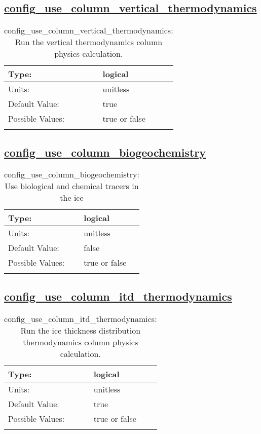 \subsection[config\_use\_column\_vertical\_thermodynamics]{\hyperref[sec:nm_tab_column_package]{config\_use\_column\_vertical\_thermodynamics}}
\label{subsec:nm_sec_config_use_column_vertical_thermodynamics}
\begin{center}
\begin{longtable}{| p{2.0in} || p{4.0in} |}
    \hline
    Type: & logical \\
    \hline
    Units: & \si{unitless} \\
    \hline
    Default Value: & true \\
    \hline
    Possible Values: & true or false \\
    \hline
    \caption{config\_use\_column\_vertical\_thermodynamics: Run the vertical thermodynamics column physics calculation.}
\end{longtable}
\end{center}
\subsection[config\_use\_column\_biogeochemistry]{\hyperref[sec:nm_tab_column_package]{config\_use\_column\_biogeochemistry}}
\label{subsec:nm_sec_config_use_column_biogeochemistry}
\begin{center}
\begin{longtable}{| p{2.0in} || p{4.0in} |}
    \hline
    Type: & logical \\
    \hline
    Units: & \si{unitless} \\
    \hline
    Default Value: & false \\
    \hline
    Possible Values: & true or false \\
    \hline
    \caption{config\_use\_column\_biogeochemistry: Use biological and chemical tracers in the ice}
\end{longtable}
\end{center}
\subsection[config\_use\_column\_itd\_thermodynamics]{\hyperref[sec:nm_tab_column_package]{config\_use\_column\_itd\_thermodynamics}}
\label{subsec:nm_sec_config_use_column_itd_thermodynamics}
\begin{center}
\begin{longtable}{| p{2.0in} || p{4.0in} |}
    \hline
    Type: & logical \\
    \hline
    Units: & \si{unitless} \\
    \hline
    Default Value: & true \\
    \hline
    Possible Values: & true or false \\
    \hline
    \caption{config\_use\_column\_itd\_thermodynamics: Run the ice thickness distribution thermodynamics column physics calculation.}
\end{longtable}
\end{center}
